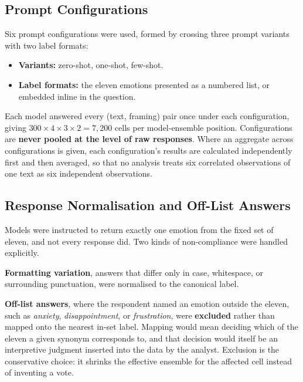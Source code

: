 \subsection{Prompt Configurations}
\label{impl:configs}

\noindent
Six prompt configurations were used, formed by crossing three prompt variants with two label
formats:

\begin{itemize}
    \item \textbf{Variants:} zero-shot, one-shot, few-shot.
    \item \textbf{Label formats:} the eleven emotions presented as a numbered list, or embedded
    inline in the question.
\end{itemize}

\noindent
Each model answered every (text, framing) pair once under each configuration, giving
$300 \times 4 \times 3 \times 2 = 7{,}200$ cells per model-ensemble position. Configurations are
\textbf{never pooled at the level of raw responses}. Where an aggregate across configurations is
given, each configuration's results are calculated independently first and then averaged, so that
no analysis treats six correlated observations of one text as six independent observations.

\subsection{Response Normalisation and Off-List Answers}
\label{impl:normalisation}

\noindent
Models were instructed to return exactly one emotion from the fixed set of eleven, and not every
response did. Two kinds of non-compliance were handled explicitly.

\textbf{Formatting variation}, answers that differ only in case, whitespace, or surrounding
punctuation, were normalised to the canonical label.

\textbf{Off-list answers}, where the respondent named an emotion outside the eleven, such as
\emph{anxiety}, \emph{disappointment}, or \emph{frustration}, were \textbf{excluded} rather than
mapped onto the nearest in-set label. Mapping would mean deciding which of the eleven a given
synonym corresponds to, and that decision would itself be an interpretive judgment inserted into
the data by the analyst. Exclusion is the conservative choice: it shrinks the effective ensemble
for the affected cell instead of inventing a vote.

